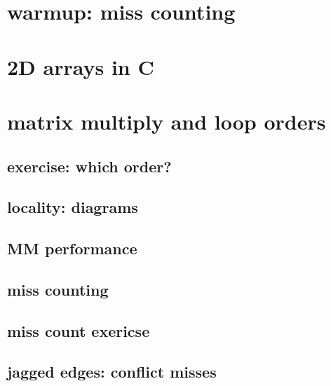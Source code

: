 \section{warmup: miss counting}


\section{2D arrays in C}



\section{matrix multiply and loop orders}

%


\subsection{exercise: which order?}

\subsection{locality: diagrams}



\subsection{MM performance}


\subsection{miss counting}


\subsection{miss count exericse}


\subsection{jagged edges: conflict misses} %



